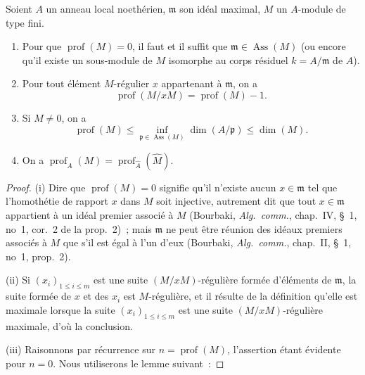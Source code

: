 \begin{proposition}[16.4.6]
\label{0.16.4.6-fr}
Soient $A$ un anneau local noethérien, $\mathfrak{m}$ son idéal maximal, $M$ un
$A$-module de type fini.
\begin{enumerate}
  \item[\rm{(i)}] Pour que $\operatorname{prof}(M)=0$, il faut et il suffit que
  $\mathfrak{m}\in\operatorname{Ass}(M)$ (ou encore qu'il existe un sous-module
  de $M$ isomorphe au corps résiduel $k=A/\mathfrak{m}$ de $A$).
  \item[\rm{(ii)}] Pour tout élément $M$-régulier $x$ appartenant à
  $\mathfrak{m}$, on a
  \begin{equation}
  \label{0.16.4.6.1-fr}
  \tag{16.4.6.1}
    \operatorname{prof}(M/xM)=\operatorname{prof}(M)-1.
  \end{equation}
  \item[\rm{(iii)}] Si $M\neq0$, on a
  \begin{equation}
  \label{0.16.4.6.2-fr}
  \tag{16.4.6.2}
    \operatorname{prof}(M)
    \leq\inf_{\mathfrak{p}\in\operatorname{Ass}(M)}\dim(A/\mathfrak{p})
    \leq\dim(M).
  \end{equation}
  \item[\rm{(iv)}] On a
  $\operatorname{prof}_A(M)=
  \operatorname{prof}_{\widehat{A}}(\widehat{M})$.
\end{enumerate}
\end{proposition}

\begin{proof}
(i) Dire que $\operatorname{prof}(M)=0$ signifie qu'il n'existe aucun
$x\in\mathfrak{m}$ tel que l'homothétie de rapport $x$ dans $M$ soit
injective, autrement dit que tout $x\in\mathfrak{m}$ appartient à un idéal
premier associé à $M$ (Bourbaki, \emph{Alg.~comm.}, chap.~IV, \S~1, no~1,
cor.~2 de la prop.~2)~; mais $\mathfrak{m}$ ne peut être réunion des idéaux
premiers associés à $M$ que s'il est égal à l'un d'eux (Bourbaki,
\emph{Alg.~comm.}, chap.~II, \S~1, no~1, prop.~2).

(ii) Si $(x_i)_{1\leq i\leq m}$ est une suite $(M/xM)$-régulière formée
d'éléments de $\mathfrak{m}$, la suite formée de $x$ et des $x_i$ est
$M$-régulière, et il résulte de la définition qu'elle est maximale lorsque la
suite $(x_i)_{1\leq i\leq m}$ est une suite $(M/xM)$-régulière maximale, d'où
la conclusion.

(iii) Raisonnons par récurrence sur $n=\operatorname{prof}(M)$, l'assertion
étant évidente pour $n=0$. Nous utiliserons le lemme suivant~:
\end{proof}

